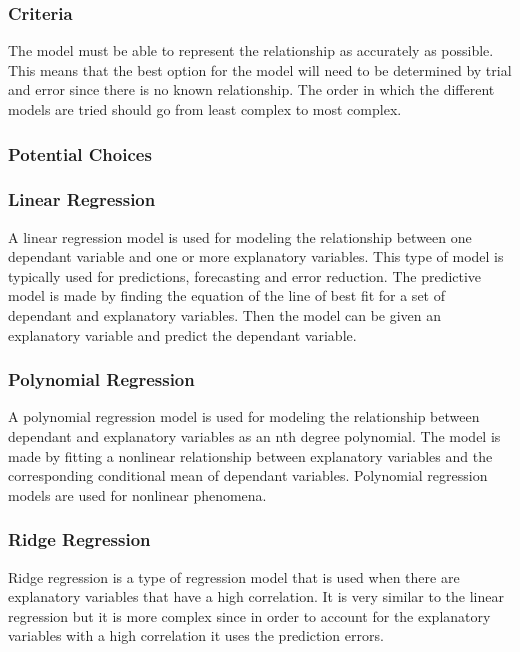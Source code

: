 		\subsubsection*{Criteria}

        The model must be able to represent the relationship as accurately as possible. This means that the best option for the model will need to be determined by trial and error since there is no known relationship. The order in which the different models are tried should go from least complex to most complex.

		\subsubsection*{Potential Choices}

		\subsubsection*{Linear Regression}
		
		A linear regression model is used for modeling the relationship between one dependant variable and one or more explanatory variables. This type of model is typically used for predictions, forecasting and error reduction. The predictive model is made by finding the equation of the line of best fit for a set of dependant and explanatory variables. Then the model can be given an explanatory variable and predict the dependant variable.\cite{Linear}

		\subsubsection*{Polynomial Regression}
		
		A polynomial regression model is used for modeling the relationship between dependant and explanatory variables as an nth degree polynomial. The model is made by fitting a nonlinear relationship between explanatory variables and the corresponding conditional mean of dependant variables. Polynomial regression models are used for nonlinear phenomena.\cite{Poly}

		\subsubsection*{Ridge Regression}
		
		Ridge regression is a type of regression model that is used when there are explanatory variables that have a high correlation. It is very similar to the linear regression but it is more complex since in order to account for the explanatory variables with a high correlation it uses the prediction errors.\cite{Ridge} 
		

